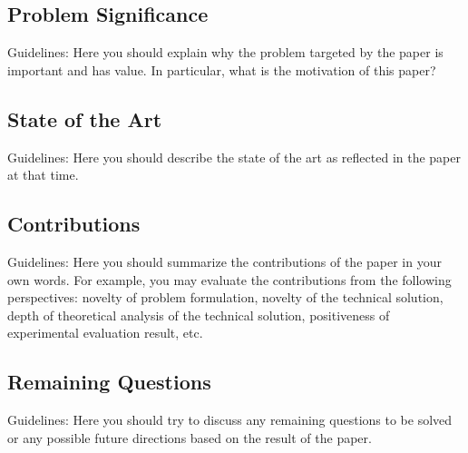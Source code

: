 \documentclass[conference]{IEEEtran}
\begin{document}
\subsection{Problem Significance}
Guidelines: Here you should explain why the problem targeted by the paper is important and has value.
%
In particular, what is the motivation of this paper?


\subsection{State of the Art}

Guidelines: Here you should describe the state of the art as reflected in the paper at that time.
%



\subsection{Contributions}
Guidelines: Here you should summarize the contributions of the paper in your own words.
%
For example, you may evaluate the contributions from the following perspectives: novelty of problem formulation, novelty of the technical solution, depth of theoretical analysis of the technical solution, positiveness of experimental evaluation result, etc.

\subsection{Remaining Questions}
Guidelines: Here you should try to discuss any remaining questions to be solved or any possible future directions based on the result of the paper.



\end{document}
